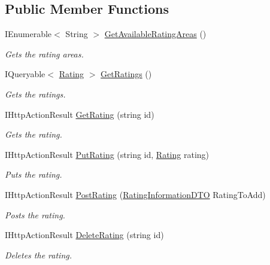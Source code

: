 \subsection*{Public Member Functions}
\begin{DoxyCompactItemize}
\item 
I\+Enumerable$<$ String $>$ \hyperlink{class_open_1_1_g_i_1_1hypermart_1_1_controllers_1_1_a_p_i_1_1_ratings_controller_a628d4db60f8c5ea8bbf03db08ee67178}{Get\+Available\+Rating\+Areas} ()
\begin{DoxyCompactList}\small\item\em Gets the rating areas. \end{DoxyCompactList}\item 
I\+Queryable$<$ \hyperlink{class_open_1_1_g_i_1_1hypermart_1_1_models_1_1_rating}{Rating} $>$ \hyperlink{class_open_1_1_g_i_1_1hypermart_1_1_controllers_1_1_a_p_i_1_1_ratings_controller_aa3ff04acf50d3bf4765f462c7fbdaf2b}{Get\+Ratings} ()
\begin{DoxyCompactList}\small\item\em Gets the ratings. \end{DoxyCompactList}\item 
I\+Http\+Action\+Result \hyperlink{class_open_1_1_g_i_1_1hypermart_1_1_controllers_1_1_a_p_i_1_1_ratings_controller_a79b77391187930a8c148fd4c3ae8e2f0}{Get\+Rating} (string id)
\begin{DoxyCompactList}\small\item\em Gets the rating. \end{DoxyCompactList}\item 
I\+Http\+Action\+Result \hyperlink{class_open_1_1_g_i_1_1hypermart_1_1_controllers_1_1_a_p_i_1_1_ratings_controller_a35f91cb72bc50655eae8e19780adb980}{Put\+Rating} (string id, \hyperlink{class_open_1_1_g_i_1_1hypermart_1_1_models_1_1_rating}{Rating} rating)
\begin{DoxyCompactList}\small\item\em Puts the rating. \end{DoxyCompactList}\item 
I\+Http\+Action\+Result \hyperlink{class_open_1_1_g_i_1_1hypermart_1_1_controllers_1_1_a_p_i_1_1_ratings_controller_a9d6b1b9e543bf0272c559a928a39541c}{Post\+Rating} (\hyperlink{class_open_1_1_g_i_1_1hypermart_1_1_data_transformation_objects_1_1_rating_information_d_t_o}{Rating\+Information\+D\+TO} Rating\+To\+Add)
\begin{DoxyCompactList}\small\item\em Posts the rating. \end{DoxyCompactList}\item 
I\+Http\+Action\+Result \hyperlink{class_open_1_1_g_i_1_1hypermart_1_1_controllers_1_1_a_p_i_1_1_ratings_controller_aaf06db00da369f94fb3bffbc05a3491f}{Delete\+Rating} (string id)
\begin{DoxyCompactList}\small\item\em Deletes the rating. \end{DoxyCompactList}\end{DoxyCompactItemize}
